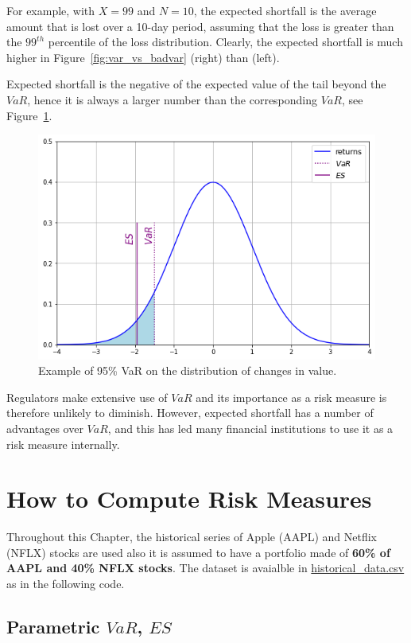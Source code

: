 For example, with $X = 99$ and $N = 10$, the expected shortfall is the average amount that is lost over a 10-day period, assuming that the loss is greater than the $99^{th}$ percentile of the loss distribution.  Clearly, the expected shortfall is much higher in Figure~\ref{fig:var_vs_badvar} (right) than (left). 

Expected shortfall is the negative of the expected value of the tail beyond the $VaR$, hence it is always a larger number than the corresponding $VaR$, see Figure~\ref{fig:es_loss}.

\begin{figure}[htb]
\centering
\includegraphics[width=0.6\linewidth]{figures/es}
\caption{Example of 95\% VaR on the distribution of changes in value.}
\label{fig:es_loss}
\end{figure}

Regulators make extensive use of $VaR$ and its importance as a risk measure is therefore unlikely to diminish. However, expected shortfall has a number of advantages over $VaR$, and this has led many financial institutions to use it as a risk measure internally. 

\section{How to Compute Risk Measures}
\label{how-to-estimate-the-var}

Throughout this Chapter, the historical series of Apple (AAPL) and Netflix (NFLX) stocks are used also it is assumed to have a portfolio made of \textbf{60\% of AAPL and 40\% NFLX stocks}. The dataset is avaialble in \href{https://raw.githubusercontent.com/matteosan1/finance_course/master/input_files/historical_data.csv}{historical\_data.csv} as in the following code.

\subsection{Parametric $VaR$, $ES$}

